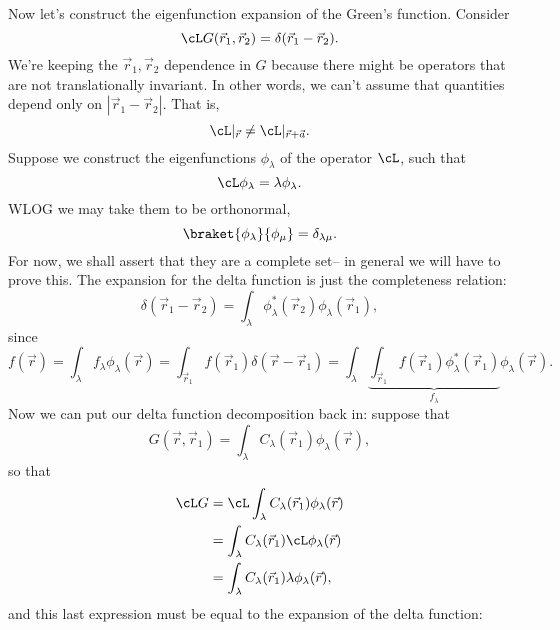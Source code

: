 Now let's construct the eigenfunction expansion of the Green's function. Consider
\begin{equation}
    \cL G(\vec r_1, \vec r_2) = \delta(\vec r_1 - \vec r_2).
\end{equation}
We're keeping the $\vec r_1, \vec r_2$ dependence in $G$ because there might be operators that are not translationally invariant. In other words, we can't assume that quantities depend only on $|\vec r_1- \vec r_2|$. That is,
\begin{equation}
    \cL|_{\vec r} \neq \cL|_{\vec r + \vec a}.
\end{equation}
Suppose we construct the eigenfunctions $\phi_\lambda$ of the operator $\cL$, such that
\begin{equation}
    \cL \phi_\lambda = \lambda \phi_\lambda.
\end{equation}
WLOG we may take them to be orthonormal,
\begin{equation}
    \braket{\phi_\lambda}{\phi_\mu} = \delta_{\lambda\mu}.
\end{equation}
For now, we shall assert that they are a complete set-- in general we will have to prove this. The expansion for the delta function is just the completeness relation:
\begin{equation}
    \delta(\vec r_1 - \vec r_2) = \int_\lambda \phi^*_\lambda(\vec r_2) \phi_\lambda(\vec r_1),
\end{equation}
since
\begin{equation}
    f(\vec r) = \int_\lambda f_\lambda \phi_\lambda(\vec r) = \int_{\vec r_1} f(\vec r_1) \delta(\vec r-\vec r_1) = \int_\lambda \underbrace{\int_{\vec r_1} f(\vec r_1) \phi_\lambda^*(\vec r_1)}_{f_\lambda} \phi_\lambda(\vec r).
\end{equation}
Now we can put our delta function decomposition back in: suppose that
\begin{equation}
    G(\vec r, \vec r_1) =\int_\lambda C_\lambda(\vec r_1) \phi_\lambda(\vec r),
\end{equation}
so that
\begin{align*}
    \cL G &= \cL \int_\lambda C_\lambda(\vec r_1) \phi_\lambda(\vec r)\\
        &=\int_\lambda C_\lambda(\vec r_1) \cL \phi_\lambda(\vec r)\\
        &= \int_\lambda C_\lambda(\vec r_1) \lambda \phi_\lambda(\vec r),
\end{align*}
and this last expression must be equal to the expansion of the delta function:
